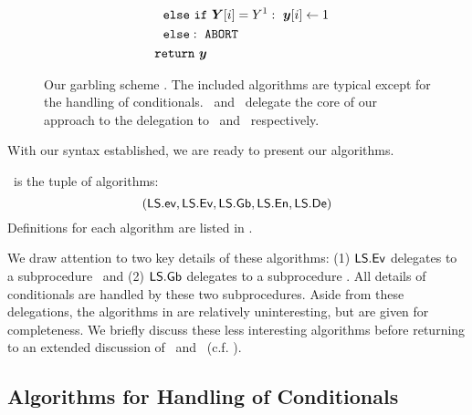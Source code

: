 \begin{figure}
\begin{adjustwidth}{-0.1\textwidth}{-0.1\textwidth}
\begin{minipage}[t]{0.40\linewidth}
\begin{align*}
      &~~~~\celse~\cif~\gcirout[i] = Y^1:~\cirout[i] \gets 1\\
      &~~~~\celse:~\mathtt{ABORT}\\
      &~~\creturn~\cirout
    \end{align*}
  \end{minipage}
  \end{adjustwidth}
  \caption{%
    Our garbling scheme \ourschemelong.
    The included algorithms are typical except for the handling of
    conditionals.
    \gEv\ and \gGb\ delegate the core of our approach to
    the delegation to
    \evcond\ and \gbcond\ respectively.
  }\label{fig:scheme}
\end{figure}


With our syntax established, we are ready to present our algorithms.
\begin{construction}[\ourschemelong]
  \ourschemelong\ is the tuple of algorithms:
  \[ (\textsf{LS}.\textsf{ev}, \textsf{LS}.\textsf{Ev}, \textsf{LS}.\textsf{Gb}, \textsf{LS}.\textsf{En}, \textsf{LS}.\textsf{De}) \]
  Definitions for each algorithm are listed in .
\end{construction}
We draw attention to two key details of these algorithms:
(1) $\textsf{LS}.\textsf{Ev}$ delegates to a subprocedure \evcond\ and (2)
$\textsf{LS}.\textsf{Gb}$ delegates to a subprocedure \gbcond.
%
All details of conditionals are handled by these two subprocedures.
%
Aside from these delegations, the algorithms in  are
relatively uninteresting, but are given for completeness.
We briefly discuss these less interesting algorithms before returning
to an extended discussion of \evcond\ and
\gbcond~(c.f. ).

\begin{itemize}
\end{itemize}

\subsection{Algorithms for Handling of
Conditionals}\label{sec:approach-cond}

